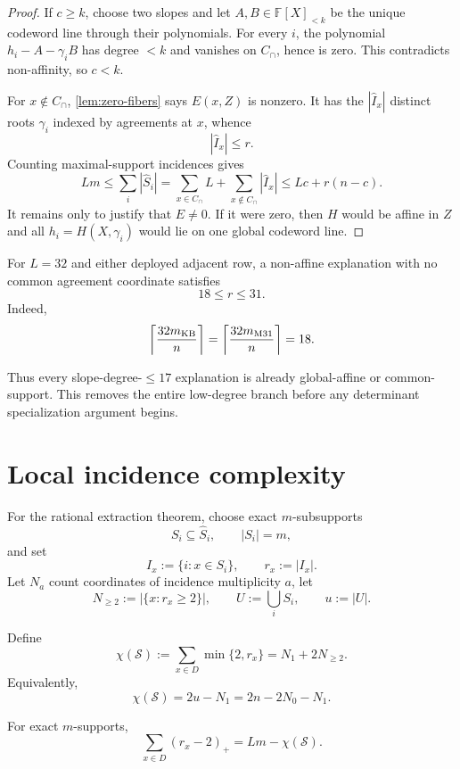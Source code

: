 \documentclass[11pt,a4paper]{amsart}
\numberwithin{equation}{section}
\theoremstyle{remark}
\newcommand{\F}{\mathbb F}\newcommand{\B}{\mathbb B}\newcommand{\K}{\mathbb K}\newcommand{\Z}{\mathbb Z}
\newcommand{\ceil}[1]{\left\lceil #1\right\rceil}\newcommand{\defeq}{\coloneqq}
\newcommand{\cS}{\mathcal S}\newcommand{\cZ}{\mathcal Z}
\begin{document}
\begin{proof}
If $c\ge k$, choose two slopes and let $A,B\in\F[X]_{<k}$ be the unique codeword line through their polynomials.  For every $i$, the polynomial $h_i-A-\gamma_iB$ has degree $<k$ and vanishes on $C_\cap$, hence is zero.  This contradicts non-affinity, so $c<k$.

For $x\notin C_\cap$, \cref{lem:zero-fibers} says $E(x,Z)$ is nonzero.  It has the $|\widehat I_x|$ distinct roots $\gamma_i$ indexed by agreements at $x$, whence
\[
 |\widehat I_x|\le r.
\]
Counting maximal-support incidences gives
\[
 Lm
 \le\sum_i|\widehat S_i|
 =\sum_{x\in C_\cap}L+\sum_{x\notin C_\cap}|\widehat I_x|
 \le Lc+r(n-c).
\]
It remains only to justify that $E\ne0$.  If it were zero, then $H$ would be affine in $Z$ and all $h_i=H(X,\gamma_i)$ would lie on one global codeword line.
\end{proof}

\begin{corollary}\label{cor:degree-18}
For $L=32$ and either deployed adjacent row, a non-affine explanation with no common agreement coordinate satisfies
\[
 \boxed{18\le r\le31.}
\]
Indeed,
\[
 \ceil{\frac{32m_{\rm KB}}{n}}
 =
 \ceil{\frac{32m_{\rm M31}}{n}}
 =18.
\]
\end{corollary}

Thus every slope-degree-$\le17$ explanation is already global-affine or common-support.  This removes the entire low-degree branch before any determinant specialization argument begins.

\section{Local incidence complexity}

For the rational extraction theorem, choose exact $m$-subsupports
\[
 S_i\subseteq\widehat S_i,
 \qquad |S_i|=m,
\]
and set
\[
 I_x:=\{i:x\in S_i\},
 \qquad r_x:=|I_x|.
\]
Let $N_a$ count coordinates of incidence multiplicity $a$, let
\[
 N_{\ge2}:=|\{x:r_x\ge2\}|,
 \qquad
 U:=\bigcup_iS_i,
 \qquad u:=|U|.
\]

\begin{definition}\label{def:chi}
Define
\[
 \chi(\cS)
 :=\sum_{x\in D}\min\{2,r_x\}
 =N_1+2N_{\ge2}.
\]
Equivalently,
\[
 \boxed{
 \chi(\cS)=2u-N_1=2n-2N_0-N_1.
 }
\]
\end{definition}

\begin{proposition}\label{prop:chi-rows}
For exact $m$-supports,
\[
 \sum_{x\in D}(r_x-2)_+
 =Lm-\chi(\cS).
\]
\end{proposition}
\end{document}

